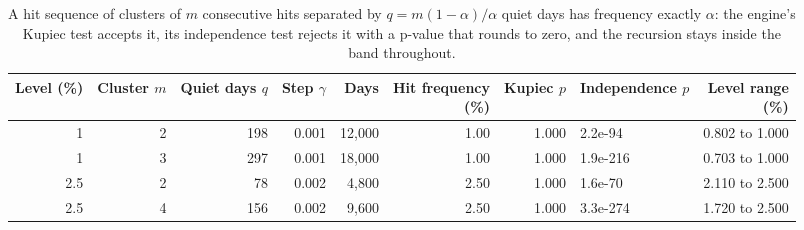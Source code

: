 \begin{table}[htbp]
\centering
\small
\caption{A hit sequence of clusters of $m$ consecutive hits separated by $q = m(1-\alpha)/\alpha$ quiet days has frequency exactly $\alpha$: the engine's Kupiec test accepts it, its independence test rejects it with a p-value that rounds to zero, and the recursion stays inside the band throughout.}
\label{tab:cluster}
{\footnotesize\setlength{\tabcolsep}{4pt}
\begin{adjustbox}{max width=\textwidth}
\begin{tabular}{rrrrrrrlr}
\toprule
Level (\%) & Cluster $m$ & \makecell[br]{Quiet days \\ $q$} & Step $\gamma$ & Days & \makecell[br]{Hit frequency \\ (\%)} & Kupiec $p$ & \makecell[bl]{Independence \\ $p$} & \makecell[br]{Level range \\ (\%)} \\
\midrule
1 & 2 & 198 & 0.001 & 12,000 & 1.00 & 1.000 & 2.2e-94 & 0.802 to 1.000 \\
1 & 3 & 297 & 0.001 & 18,000 & 1.00 & 1.000 & 1.9e-216 & 0.703 to 1.000 \\
2.5 & 2 & 78 & 0.002 & 4,800 & 2.50 & 1.000 & 1.6e-70 & 2.110 to 2.500 \\
2.5 & 4 & 156 & 0.002 & 9,600 & 2.50 & 1.000 & 3.3e-274 & 1.720 to 2.500 \\
\bottomrule
\end{tabular}
\end{adjustbox}}
\end{table}
